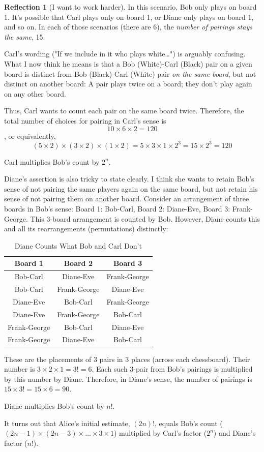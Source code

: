 \documentclass[11pt]{book}
\theoremstyle{definition}
\theoremstyle{plain}
\theoremstyle{definition}
\theoremstyle{problemstyle}
\theoremstyle{remark}
\theoremstyle{definition}
\newtheorem{reflection}{Reflection}
\begin{document}
\begin{reflection}[I want to work harder]
    In this scenario, Bob only plays on board 1. It's possible that Carl plays only on board 1, or Diane only plays on board 1, and so on. In each of those scenarios (there are 6), the \emph{number of pairings stays the same}, 15.

    Carl's wording ("If we include in it who plays white\dots") is arguably confusing. What I now think he means is that a Bob (White)-Carl (Black) pair on a given board is distinct from Bob (Black)-Carl (White) pair \emph{on the same board}, but not distinct on another board: A pair plays twice on a board; they don't play again on any other board.

    Thus, Carl wants to count each pair on the same board twice. Therefore, the total number of choices for pairing in Carl's sense is
    \[
       10\times 6\times 2=120 
    \], or equivalently,
    \[
        (5\times 2)\times(3\times 2)\times(1\times 2)=5\times 3\times 1\times 2^3=15\times 2^3=120
    \]

    Carl multiplies Bob's count by $2^n$.

    Diane's assertion is also tricky to state clearly. I think she wants to retain Bob's sense of not pairing the same players again on the same board, but not retain his sense of not pairing them on another board. Consider an arrangement of three boards in Bob's sense: Board 1: Bob-Carl, Board 2: Diane-Eve, Board 3: Frank-George. This 3-board arrangement is counted by Bob. However, Diane counts this and all its rearrangements (permutations) distinctly: 

\begin{table}[H] 
\centering
\begin{tabular}{|c|c|c|}
 \hline
 Board 1&Board 2&Board 3\\ \hline
 \hline
    Bob-Carl&Diane-Eve&Frank-George\\ \hline
    Bob-Carl&Frank-George&Diane-Eve\\ \hline
    Diane-Eve&Bob-Carl&Frank-George\\ \hline
    Diane-Eve&Frank-George&Bob-Carl\\ \hline
    Frank-George&Bob-Carl&Diane-Eve\\ \hline
    Frank-George&Diane-Eve&Bob-Carl\\ \hline
\end{tabular}

\label{tab:diane-sense}
\caption{Diane Counts What Bob and Carl Don't}
\end{table}

    These are the placements of 3 pairs in 3 places (across each chessboard). Their number is $3\times 2\times 1=3!=6$. Each such 3-pair from Bob's pairings is multiplied by this number by Diane. Therefore, in Diane's sense, the number of pairings is $15\times 3!=15\times 6=90$.

    Diane multiplies Bob's count by $n!$.

    It turns out that Alice's initial estimate, $(2n)!$, equals Bob's count ($(2n-1)\times(2n-3)\times\dots\times 3\times 1$) multiplied by Carl's factor ($2^{n}$) and Diane's factor ($n!$). 
\end{reflection}
\end{document}

